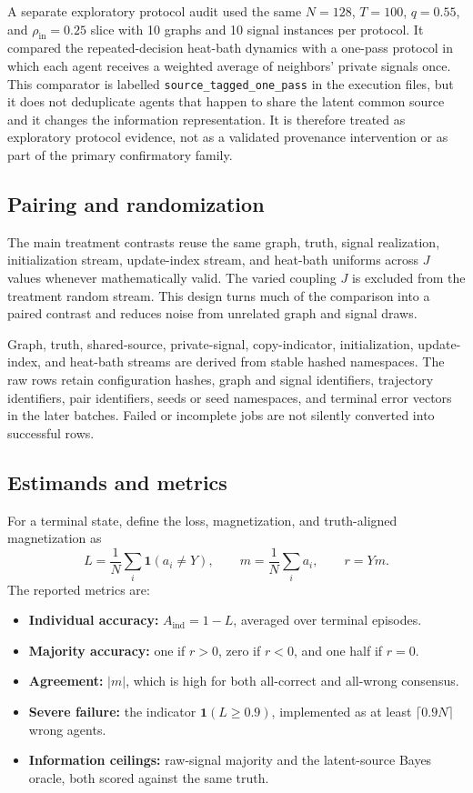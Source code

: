 \documentclass[11pt,a4paper]{article}
\begin{document}
A separate exploratory protocol audit used the same $N=128$, $T=100$, $q=0.55$, and $\rho_{\mathrm{in}}=0.25$ slice with 10 graphs and 10 signal instances per protocol. It compared the repeated-decision heat-bath dynamics with a one-pass protocol in which each agent receives a weighted average of neighbors' private signals once. This comparator is labelled \texttt{source\_tagged\_one\_pass} in the execution files, but it does not deduplicate agents that happen to share the latent common source and it changes the information representation. It is therefore treated as exploratory protocol evidence, not as a validated provenance intervention or as part of the primary confirmatory family.

\subsection{Pairing and randomization}

The main treatment contrasts reuse the same graph, truth, signal realization, initialization stream, update-index stream, and heat-bath uniforms across $J$ values whenever mathematically valid. The varied coupling $J$ is excluded from the treatment random stream. This design turns much of the comparison into a paired contrast and reduces noise from unrelated graph and signal draws.

Graph, truth, shared-source, private-signal, copy-indicator, initialization, update-index, and heat-bath streams are derived from stable hashed namespaces. The raw rows retain configuration hashes, graph and signal identifiers, trajectory identifiers, pair identifiers, seeds or seed namespaces, and terminal error vectors in the later batches. Failed or incomplete jobs are not silently converted into successful rows.

\subsection{Estimands and metrics}

For a terminal state, define the loss, magnetization, and truth-aligned magnetization as
\[
L=\frac{1}{N}\sum_i\mathbf{1}(a_i\ne Y),\qquad
m=\frac{1}{N}\sum_i a_i,\qquad
r=Ym.
\]
The reported metrics are:

\begin{itemize}
  \item \textbf{Individual accuracy:} $A_{\mathrm{ind}}=1-L$, averaged over terminal episodes.
  \item \textbf{Majority accuracy:} one if $r>0$, zero if $r<0$, and one half if $r=0$.
  \item \textbf{Agreement:} $|m|$, which is high for both all-correct and all-wrong consensus.
  \item \textbf{Severe failure:} the indicator $\mathbf{1}(L\ge0.9)$, implemented as at least $\lceil0.9N\rceil$ wrong agents.
  \item \textbf{Information ceilings:} raw-signal majority and the latent-source Bayes oracle, both scored against the same truth.
\end{itemize}
\end{document}

